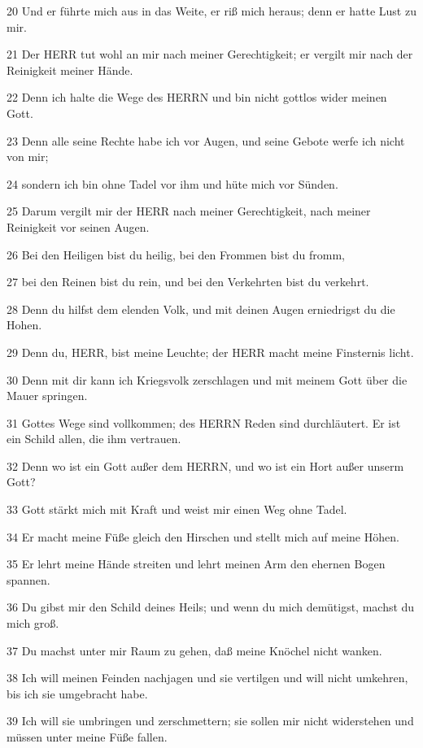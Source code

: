 \par 20 Und er führte mich aus in das Weite, er riß mich heraus; denn er hatte Lust zu mir.
\par 21 Der HERR tut wohl an mir nach meiner Gerechtigkeit; er vergilt mir nach der Reinigkeit meiner Hände.
\par 22 Denn ich halte die Wege des HERRN und bin nicht gottlos wider meinen Gott.
\par 23 Denn alle seine Rechte habe ich vor Augen, und seine Gebote werfe ich nicht von mir;
\par 24 sondern ich bin ohne Tadel vor ihm und hüte mich vor Sünden.
\par 25 Darum vergilt mir der HERR nach meiner Gerechtigkeit, nach meiner Reinigkeit vor seinen Augen.
\par 26 Bei den Heiligen bist du heilig, bei den Frommen bist du fromm,
\par 27 bei den Reinen bist du rein, und bei den Verkehrten bist du verkehrt.
\par 28 Denn du hilfst dem elenden Volk, und mit deinen Augen erniedrigst du die Hohen.
\par 29 Denn du, HERR, bist meine Leuchte; der HERR macht meine Finsternis licht.
\par 30 Denn mit dir kann ich Kriegsvolk zerschlagen und mit meinem Gott über die Mauer springen.
\par 31 Gottes Wege sind vollkommen; des HERRN Reden sind durchläutert. Er ist ein Schild allen, die ihm vertrauen.
\par 32 Denn wo ist ein Gott außer dem HERRN, und wo ist ein Hort außer unserm Gott?
\par 33 Gott stärkt mich mit Kraft und weist mir einen Weg ohne Tadel.
\par 34 Er macht meine Füße gleich den Hirschen und stellt mich auf meine Höhen.
\par 35 Er lehrt meine Hände streiten und lehrt meinen Arm den ehernen Bogen spannen.
\par 36 Du gibst mir den Schild deines Heils; und wenn du mich demütigst, machst du mich groß.
\par 37 Du machst unter mir Raum zu gehen, daß meine Knöchel nicht wanken.
\par 38 Ich will meinen Feinden nachjagen und sie vertilgen und will nicht umkehren, bis ich sie umgebracht habe.
\par 39 Ich will sie umbringen und zerschmettern; sie sollen mir nicht widerstehen und müssen unter meine Füße fallen.
